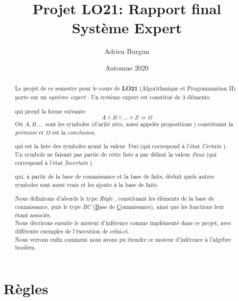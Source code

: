 \documentclass[12pt]{article}
\title{Projet LO21: Rapport final \\ \large \og Système Expert \fg}
\author{Adrien Burgun}
\date{Automne 2020}
\begin{document}
\maketitle

\begin{abstract}

  Le projet de ce semestre pour le cours de \textbf{LO21} (Algorithmique et Programmation II) porte sur un \textit{\og système expert \fg}.
  Un système expert est constitué de 3 éléments:

  \begin{description}[align=left]
    \item [Une base de connaissance,] qui prend la forme suivante:
    \[
      A \land B \land ... \land Z \Rightarrow \Omega
    \]
    Où \(A, B, ...\) sont les symboles (d'arité zéro, aussi appelés \og propositions \fg) constituant la \textit{prémisse} et \(\Omega\) est la \textit{conclusion}.

    \item [Une base de faits,] qui est la liste des symboles ayant la valeur \textit{\og Vrai \fg} (qui correspond à l'état \textit{\og Certain \fg}). \\
    Un symbole ne faisant pas partie de cette liste a par défaut la valeur \textit{\og Faux \fg} (qui correspond à l'état \textit{\og Incertain \fg}).

    \item [Un moteur d'inférence,] qui, à partir de la base de connaissance et la base de faits, déduit quels autres symboles sont aussi vrais et les ajoute à la base de faits.
  \end{description}

  Nous définirons d'abords le type \textit{\og Règle \fg}, constituant les éléments de la base de connaissance, puis le type \textit{\og BC \fg} (\underline{B}ase de \underline{C}onnaissance), ainsi que les fonctions leur étant associés. \\
  Nous décrirons ensuite le moteur d'inférence comme implémenté dans ce projet, avec différents exemples de l'éxecution de celui-ci. \\
  Nous verrons enfin comment nous avons pu étendre ce moteur d'inférence à l'algèbre booléen.

\end{abstract}

\newpage
\tableofcontents
\newpage

\section{Règles}
\end{document}
